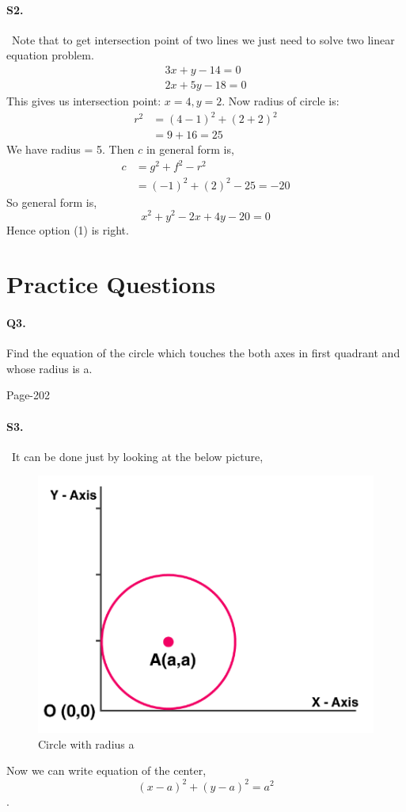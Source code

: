 \documentclass{article}
\begin{document}
\paragraph{S2.}\
Note that to get intersection point of two lines we just need to solve two linear equation problem.
\begin{align*}
    3x + y - 14 = 0\\
    2x + 5y - 18 = 0
\end{align*}
This gives us intersection point: $x=4, y=2$. Now radius of circle is:
\begin{align*}
    r^2&=(4-1)^2+(2+2)^2\\
    &=9+16=25
\end{align*}
We have radius = 5. Then $c$ in general form is,
\begin{align*}
    c&=g^2+f^2-r^2\\
    &=(-1)^2+(2)^2-25=-20
\end{align*} 
So general form is,
$$x^2 + y^2 - 2x + 4y - 20 = 0$$
Hence option (1) is right.

\clearpage
\section*{Practice Questions}
\paragraph{Q3.}Find the equation of the circle which touches the both axes in first quadrant and
whose radius is a.
\begin{flushright}
    Page-202
\end{flushright}
\paragraph{S3.}\
It can be done just by looking at the below picture,
\begin{figure}[H]
    \centering
    \includegraphics[scale=0.3]{l2_ps2-3.png}
    \caption{Circle with radius a}
\end{figure}
Now we can write equation of the center,
\begin{equation*}
    (x-a)^2+(y-a)^2=a^2
\end{equation*}.
\end{document}
